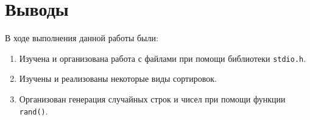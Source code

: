 \section{Выводы}

В ходе выполнения данной работы были:

\begin{enumerate}
  \item Изучена и организована работа с файлами при помощи библиотеки \texttt{stdio.h}.
  \item Изучены и реализованы некоторые виды сортировок.
  \item Организован генерация случайных строк и чисел при помощи функции \texttt{rand()}.
\end{enumerate}